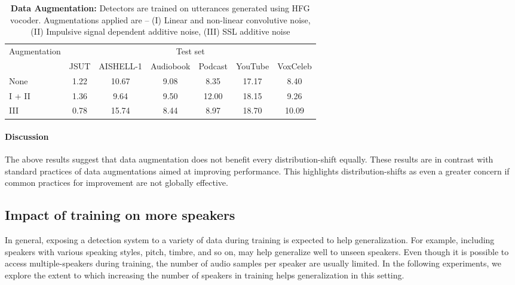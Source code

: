 \begin{table*}[htb!]
    \caption{\textbf{Data Augmentation:} Detectors are trained on utterances generated using HFG vocoder. Augmentations applied are -- (I) Linear and non-linear convolutive noise, (II) Impulsive signal dependent additive noise, (III) SSL additive noise}
    \label{tab:exp_aug}
    \vskip 0.15in
\begin{center}
\begin{small}
\begin{sc}
    \begin{tabular}{lcccccc}
      \toprule
      Augmentation & \multicolumn{6}{c}{Test set }\\ 
      \cmidrule{2-7} & JSUT & AISHELL-1 & Audiobook & Podcast & YouTube & VoxCeleb \\
      \hline
      None & 1.22 & 10.67 & 9.08 & 8.35 & 17.17 & 8.40 \\ 
      \hline
       I + II & 1.36 & 9.64 & 9.50 &  12.00 & 18.15 & 9.26  \\
      \hline
      III  & 0.78 & 15.74 & 8.44 & 8.97 & 18.70 & 10.09  \\
      \bottomrule 
    \end{tabular}
    \end{sc}
\end{small}
\end{center}
\vskip -0.1in
\end{table*}

\paragraph{Discussion} The above results suggest that data augmentation does not benefit every distribution-shift equally. These results are in contrast with standard practices of data augmentations aimed at improving performance. This highlights distribution-shifts as even a greater concern if common practices for improvement are not globally effective.

\subsection{Impact of training on more speakers} \label{sec:exp-5} 
In general, exposing a detection system to a variety of data during training is expected to help generalization. For example, including speakers with various speaking styles, pitch, timbre, and so on, may help generalize well to unseen speakers. Even though it is possible to access multiple-speakers during training, the number of audio samples per speaker are usually limited. In the following experiments, we explore the extent to which increasing the number of speakers in training helps generalization in this setting. 

